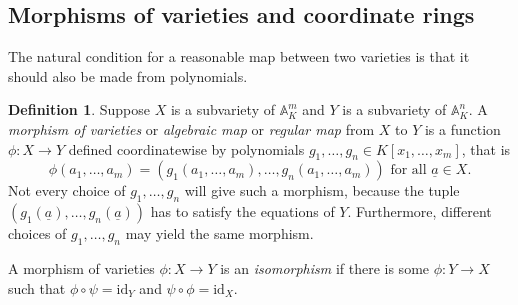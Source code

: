\documentclass{amsart}[12pt]
\newcommand{\va}{\underline{a}}
\newcommand{\id}{\mathrm{id}}
\newcommand{\A}{\mathbb{A}}
\newcommand{\R}{{\mathbb{R}}}
\newcommand{\F}{\mathbb{F}}
\newcommand{\C}{\mathbb{C}}
\newcommand{\cZ}{\mathcal{Z}}
\newcommand{\cI}{\mathcal{I}}
\numberwithin{equation}{section}
\theoremstyle{plain} %
\theoremstyle{definition}
\newtheorem{defn}[equation]{Definition}
\theoremstyle{remark}
\newcommand{\ssec}[1]{\subsection{#1}}
\def\va{\underline{a}}
\begin{document}



\ssec{Morphisms of varieties and coordinate rings}

The natural condition for a reasonable map between two varieties is that it should also be made from polynomials.

\begin{defn} \label{def26}
Suppose $X$ is a subvariety of $\A^m_K$ and $Y$ is a subvariety of $\A^n_K$. A {\em morphism of varieties} or  {\em algebraic map} or {\em regular map} from $X$ to $Y$ is a function $\phi: X \to Y$ defined coordinatewise by polynomials $g_1, \dots, g_n\in K[x_1, \dots, x_m]$, that is 
$$
\phi(a_1, \dots, a_m) = (g_1(a_1, \dots, a_m), \dots, g_n(a_1, \dots, a_m)) \text{ for all }\va\in X.
$$
Not every choice of $g_1, \dots, g_n$ will give such a morphism, because the tuple $ (g_1(\va), \dots, g_n(\va))$ has to satisfy the equations of $Y$. Furthermore, different choices of $g_1, \dots, g_n$ may yield the same morphism.

A morphism of varieties $\phi: X \to Y$ is an \emph{isomorphism} if there is some $\phi: Y \to X$ such that $\phi\circ \psi = \id_Y$ and $\psi \circ \phi = \id_X$.  
\end{defn}
\end{document}
